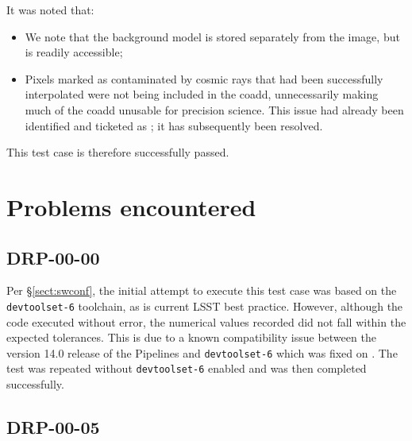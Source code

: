 \documentclass[DM,STR,toc]{lsstdoc}
\begin{document}
It was noted that:

\begin{itemize}

  \item{We note that the background model is stored separately from the image, but is readily accessible;}
  \item{
    Pixels marked as contaminated by cosmic rays that had been successfully interpolated were not being included in the coadd, unnecessarily making much of the coadd unusable for precision science.
    This issue had already been identified and ticketed as ; it has subsequently been resolved.
  }

\end{itemize}

This test case is therefore successfully passed.

\section{Problems encountered}

\subsection{DRP-00-00}
\label{sect:problems-drp-00-00}

Per \S\ref{sect:swconf}, the initial attempt to execute this test case was based on the \texttt{devtoolset-6} toolchain, as is current LSST best practice.
However, although the code executed without error, the numerical values recorded did not fall within the expected tolerances.
This is due to a known compatibility issue between the version 14.0 release of the Pipelines and \texttt{devtoolset-6} which was fixed on .
The test was repeated without \texttt{devtoolset-6} enabled and was then completed successfully.

\subsection{DRP-00-05}
\label{sect:problems-drp-00-05}
\end{document}
